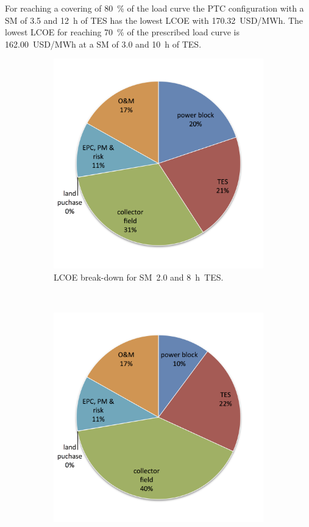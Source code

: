 For reaching a covering of 80~\% of the load curve the PTC configuration with a SM of 3.5 and 12~h of TES has the lowest LCOE with 170.32~USD/MWh. The lowest LCOE for reaching 70~\% of the prescribed load curve is 162.00~USD/MWh at a SM of 3.0 and 10~h of TES.
\begin{figure}[!htbp]
        \centering                
        \begin{subfigure}[b]{0.5\textwidth}
                \centering
                \includegraphics[width=1\textwidth]{FIG/PTC_LCOE_lowinvest_BreakDown}
                \caption{LCOE break-down for SM~2.0 and 8~h~TES.}\label{PTC_LCOE_lowinvest_BreakDown}
        \end{subfigure}%
        ~
        \begin{subfigure}[b]{0.5\textwidth}
                \centering
                \includegraphics[width=1\textwidth]{FIG/PTC_LCOE_highinvest_BreakDown}

\end{subfigure}
\end{figure}
